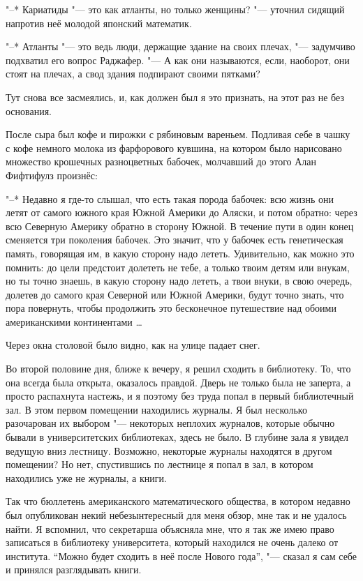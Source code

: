 "--* Кариатиды "--- это как атланты, но только женщины? "--- уточнил сидящий
напротив неё молодой японский математик.

"--* Атланты "--- это ведь люди, держащие здание на своих плечах, "---
задумчиво подхватил его вопрос Раджафер.
"--- А как они называются, если, наоборот, они стоят на плечах, а свод здания
подпирают своими пятками?

Тут снова все засмеялись, и, как должен был я это признать, на этот раз не без
основания.

После сыра был кофе и пирожки с рябиновым вареньем.
Подливая себе в чашку с кофе немного молока из фарфорового кувшина, на котором
было нарисовано множество крошечных разноцветных бабочек, молчавший до этого
Алан Фифтифулз произнёс:

"--* Недавно я где-то слышал, что есть такая порода бабочек:
всю жизнь они летят от самого южного края Южной Америки до Аляски, и потом
обратно: через всю Северную Америку обратно в сторону Южной.
В течение пути в один конец сменяется три поколения бабочек.
Это значит, что у бабочек есть генетическая память, говорящая им, в какую
сторону надо лететь.
Удивительно, как можно это помнить:
до цели предстоит долететь не тебе, а только твоим детям или внукам, но ты точно
знаешь, в какую сторону надо лететь, а твои внуки, в свою очередь, долетев до
самого края Северной или Южной Америки, будут точно знать, что пора повернуть,
чтобы продолжить это бесконечное путешествие над обоими американскими
континентами \ldots

Через окна столовой было видно, как на улице падает снег.

Во второй половине дня, ближе к вечеру, я решил сходить в библиотеку.
То, что она всегда была открыта, оказалось правдой.
Дверь не только была не заперта, а просто распахнута настежь, и я поэтому без
труда попал в первый библиотечный зал.
В этом первом помещении находились журналы.
Я был несколько разочарован их выбором "--- некоторых неплохих журналов,
которые обычно бывали в университетских библиотеках, здесь не было.
В глубине зала я увидел ведущую вниз лестницу.
Возможно, некоторые журналы находятся в другом помещении?
Но нет, спустившись по лестнице я попал в зал, в котором находились уже не
журналы, а книги.

Так что бюллетень американского математического общества, в котором недавно был
опубликован некий небезынтересный для меня обзор, мне так и не удалось найти.
Я вспомнил, что секретарша объясняла мне, что я так же имею право записаться в
библиотеку университета, который находился не очень далеко от института.
\enquote{Можно будет сходить в неё после Нового года}, "--- сказал я сам себе и
принялся разглядывать книги.

